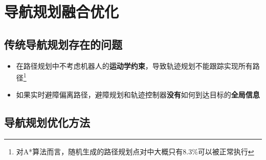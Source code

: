 \documentclass[../main.tex]{subfiles}
\begin{document}
\section{导航规划融合优化}
\subsection{传统导航规划存在的问题}
\begin{itemize}
    \item 在路径规划中不考虑机器人的\textbf{运动学约束}，导致轨迹规划不能跟踪实现所有路径\footnote{对A*算法而言，随机生成的路径规划点对中大概只有8.3\%可以被正常执行}
    \item 如果实时避障偏离路径，避障规划和轨迹控制器\textbf{没有}如何到达目标的\textbf{全局信息}
\end{itemize}
\subsection{导航规划优化方法}
\end{document}
